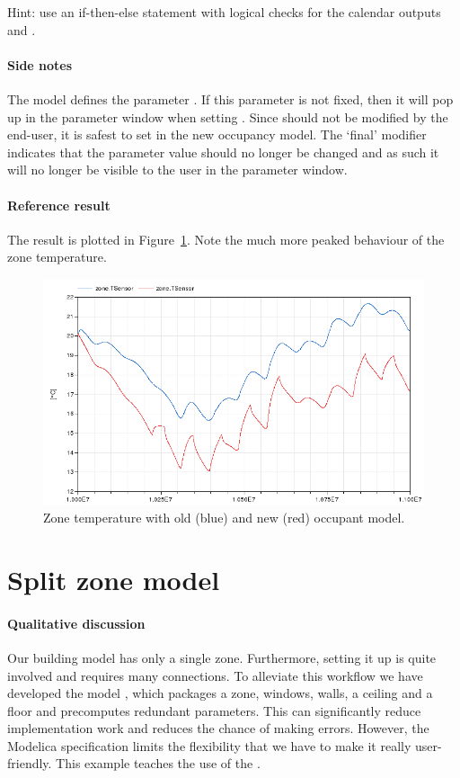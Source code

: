 \documentclass[10pt,a4paper]{article}
\begin{document}
Hint: use an if-then-else statement with logical checks for the calendar outputs  and .

\paragraph{Side notes}
The model  
defines the parameter .
If this parameter is not fixed, then it will pop up in the parameter window when
setting . Since  should not be modified by the end-user,
it is safest to set  in the new occupancy model.
The `final' modifier indicates that the parameter value should no longer be changed
and as such it will no longer be visible to the user in the parameter window.

\paragraph{Reference result}
The result 
is plotted in Figure~\ref{fig:res4}.
Note the much more peaked behaviour of the zone temperature.



\begin{figure}
\centering
\includegraphics[scale=0.7]{Example4.png}
\caption{Zone temperature with old (blue) and new (red) occupant model.}
\label{fig:res4}
\end{figure}


\section{Split zone model}
\paragraph{Qualitative discussion}
Our building model has only a single zone. 
Furthermore, setting it up is quite involved and requires many connections.
To alleviate this workflow we have developed the model
, which packages a zone, 
windows, walls, a ceiling and a floor and precomputes redundant parameters.
This can significantly reduce implementation work and reduces the chance of making 
errors. 
However, the Modelica specification limits the flexibility that we have to make it really
user-friendly.
This example teaches the use of the .\\
\end{document}
